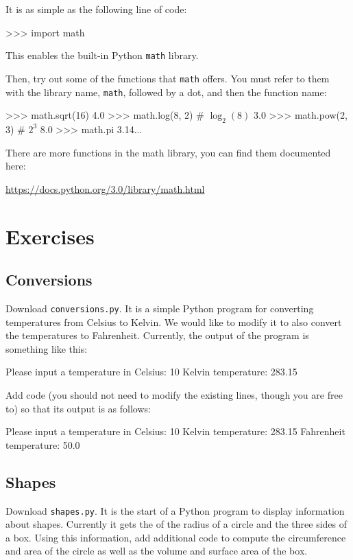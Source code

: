 \documentclass[11pt]{cselabheader}
\begin{document}
It is as simple as the following line of code:

\begin{pyconcode}
>>> import math
\end{pyconcode}

This enables the built-in Python \texttt{math} library.

Then, try out some of the functions that \texttt{math} offers. You must refer to
them with the library name, \texttt{math}, followed by a dot, and then the
function name:

\begin{pyconcode}
>>> math.sqrt(16)
4.0
>>> math.log(8, 2) # $\log_2(8)$
3.0
>>> math.pow(2, 3) # $2^3$
8.0
>>> math.pi
3.14...
\end{pyconcode}

There are more functions in the math library, you can find them documented here:
\begin{center}
\url{https://docs.python.org/3.0/library/math.html}
\end{center}

\pagebreak

\section{Exercises}
\subsection{Conversions}
Download \texttt{conversions.py}. It is a simple Python program for converting
temperatures from Celsius to Kelvin. We would like to modify it to also convert
the temperatures to Fahrenheit. Currently, the output of the program is
something like this:

\begin{bashcode}
Please input a temperature in Celsius: 10
Kelvin temperature: 283.15
\end{bashcode}

Add code (you should not need to modify the existing lines, though you are free
to) so that its output is as follows:

\begin{bashcode}
Please input a temperature in Celsius: 10
Kelvin temperature: 283.15
Fahrenheit temperature: 50.0
\end{bashcode}

\subsection{Shapes}
Download \texttt{shapes.py}. It is the start of a Python program to display
information about shapes. Currently it gets the of the radius of a circle and
the three sides of a box. Using this information, add additional code to compute
the circumference and area of the circle as well as the volume and surface area
of the box.
\end{document}
